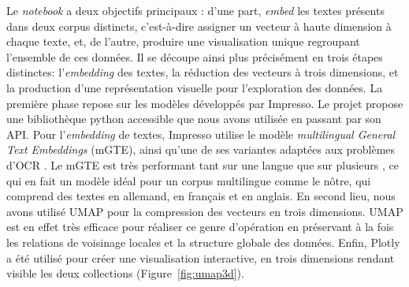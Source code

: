 \documentclass[final, fra]{anthology-ch}     %
\begin{document}
Le \textit{notebook} \cite{Michelet2026b} a deux objectifs principaux : d’une part, \textit{embed} les textes présents dans deux corpus distincts, c’est-à-dire assigner un vecteur à haute dimension à chaque texte, et, de l’autre, produire une visualisation unique regroupant l’ensemble de ces données. Il se découpe ainsi plus précisément en trois étapes distinctes: l’\textit{embedding} des textes, la réduction des vecteurs à trois dimensions, et la production d’une représentation visuelle pour l'exploration des données. La première phase repose sur les modèles développés par Impresso. Le projet propose une bibliothèque python accessible que nous avons utilisée en passant par son API. Pour l’\textit{embedding} de textes, Impresso utilise le modèle \textit{multilingual General Text Embeddings} (mGTE), ainsi qu’une de ses variantes adaptées aux problèmes d’OCR \cite{Michail2025e}. Le mGTE est très performant tant sur une langue que sur plusieurs \cite{Enevoldsen2025a}, ce qui en fait un modèle idéal pour un corpus multilingue comme le nôtre, qui comprend des textes en allemand, en français et en anglais. En second lieu, nous avons utilisé UMAP pour la compression des vecteurs en trois dimensions. UMAP est en effet très efficace pour réaliser ce genre d’opération en préservant à la fois les relations de voisinage locales et la structure globale des données. Enfin, Plotly a été utilisé pour créer une visualisation interactive, en trois dimensions rendant visible les deux collections (Figure~\ref{fig:umap3d}).
\end{document}
